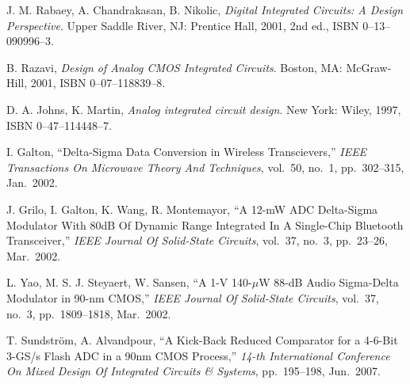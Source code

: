 \begin{thebibliography}{9}

	J. M. Rabaey, A. Chandrakasan, B. Nikolic,
	\emph{Digital Integrated Circuits: A Design Perspective}.
	Upper Saddle River, NJ: Prentice Hall,
	2001, 2nd ed.,
	ISBN 0--13--090996--3.

	B. Razavi,
	\emph{Design of Analog CMOS Integrated Circuits}.
	Boston, MA: McGraw-Hill,
	2001,
	ISBN 0--07--118839--8.

	D. A. Johns, K. Martin,
	\emph{Analog integrated circuit design}.
	New York: Wiley,
	1997,
	ISBN 0--47--114448--7.

	I. Galton,
	``Delta-Sigma Data Conversion in Wireless Transcievers,''
	\emph{IEEE Transactions On Microwave Theory And Techniques},
	vol.~50, no.~1,
	pp.~302--315,
	Jan.~2002.
	
	J. Grilo, I. Galton, K. Wang, R. Montemayor,
	``A 12-mW ADC Delta-Sigma Modulator With 80dB Of Dynamic Range Integrated In A Single-Chip Bluetooth Transceiver,''
	\emph{IEEE Journal Of Solid-State Circuits},
	vol.~37, no.~3,
	pp.~23--26,
	Mar.~2002.

	L. Yao, M. S. J. Steyaert,  W. Sansen,
	``A 1-V 140-$\mu$W 88-dB Audio Sigma-Delta Modulator in 90-nm CMOS,''
	\emph{IEEE Journal Of Solid-State Circuits},
	vol.~37, no.~3,
	pp.~1809--1818,
	Mar.~2002.

	T. Sundstr\"{o}m, A. Alvandpour,
	``A Kick-Back Reduced Comparator for a 4-6-Bit 3-GS/s Flash ADC in a 90nm CMOS Process,''
	\emph{14-th International Conference On Mixed Design Of Integrated Circuits \& Systems},
	pp.~195--198,
	Jun.~2007.
\end{thebibliography}